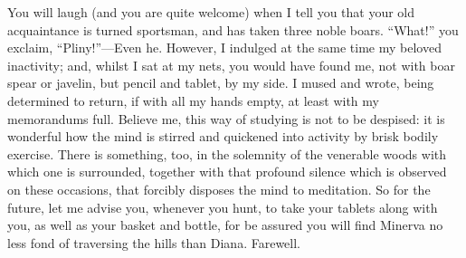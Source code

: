 
You will laugh (and you are quite welcome) when I tell you that your old
acquaintance is turned sportsman, and has taken three noble boars. ``What!''
you exclaim, ``Pliny!''—Even he. However, I indulged at the same time
my beloved inactivity; and, whilst I sat at my nets, you would have found
me, not with boar spear or javelin, but pencil and tablet, by my side. I
mused and wrote, being determined to return, if with all my hands empty,
at least with my memorandums full. Believe me, this way of studying is not
to be despised: it is wonderful how the mind is stirred and quickened into
activity by brisk bodily exercise. There is something, too, in the
solemnity of the venerable woods with which one is surrounded, together
with that profound silence which is observed on these occasions, that
forcibly disposes the mind to meditation. So for the future, let me advise
you, whenever you hunt, to take your tablets along with you, as well as
your basket and bottle, for be assured you will find Minerva no less fond
of traversing the hills than Diana. Farewell.


